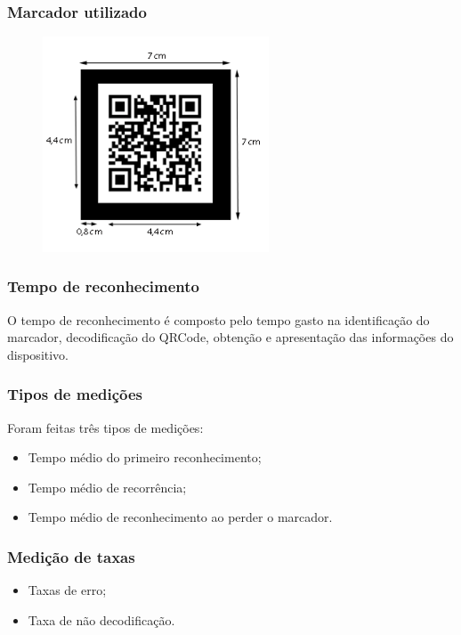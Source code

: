 \documentclass{beamer}
\begin{document}
	\begin{frame}
	\frametitle{Marcador utilizado}
		\begin{figure}[htb]
			\begin{center}
					\includegraphics[width=0.6\textwidth]{figuras/dimensoes_marcador.png}
			\end{center}
		\end{figure}
	\end{frame}


	\begin{frame}
		\frametitle{Tempo de reconhecimento}
		
		O tempo de reconhecimento é composto pelo tempo gasto na identificação do marcador,
		decodificação do QRCode, obtenção e apresentação das informações do dispositivo. 
	\end{frame}
	
	\begin{frame}
		\frametitle{Tipos de medições}
		Foram feitas três tipos de medições:
		\begin{itemize}
		  \item Tempo médio do primeiro reconhecimento;
		  \item Tempo médio de recorrência;
		  \item Tempo médio de reconhecimento ao perder o marcador.
		\end{itemize}
	\end{frame}
		  
	\begin{frame}
		\frametitle{Medição de taxas}
		
		\begin{itemize}
		  \item Taxas de erro;
		  \item Taxa de não decodificação.
		\end{itemize}
	\end{frame}
	
\end{document}
